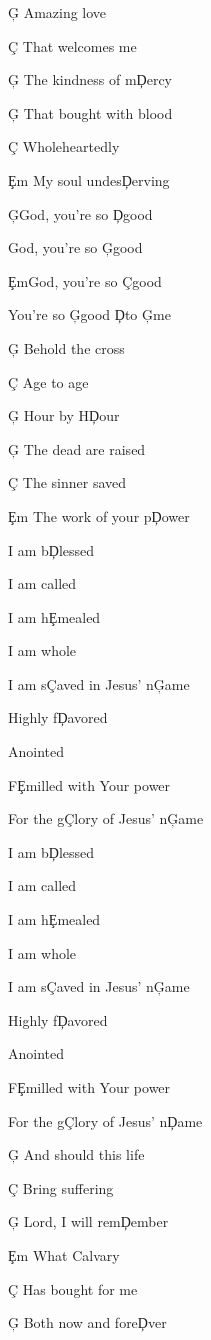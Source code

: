 \documentclass[9pt]{extarticle}
\begin{document}
\bsong

\bv
\c{G} Amazing love

\c{C} That welcomes me

\c{G} The kindness of m\c{D}ercy

\c{G} That bought with blood

\c{C} Wholeheartedly

\c{Em} My soul undes\c{D}erving
\ev

\bc
\c{G}God, you're so \c{D}good

God, you're so \c{G}good

\c{Em}God, you're so \c{C}good

You're so \c{G}good \c{D}to \c{G}me
\ec

\bv
\c{G} Behold the cross

\c{C} Age to age

\c{G} Hour by H\c{D}our

\c{G} The dead are raised

\c{C} The sinner saved

\c{Em} The work of your p\c{D}ower
\ev


\bb
I am b\c{D}lessed

I am called

I am h\c{Em}ealed

I am whole

I am s\c{C}aved in Jesus' n\c{G}ame

Highly f\c{D}avored

Anointed

F\c{Em}illed with Your power

For the g\c{C}lory of Jesus' n\c{G}ame
\eb

\bb
I am b\c{D}lessed

I am called

I am h\c{Em}ealed

I am whole

I am s\c{C}aved in Jesus' n\c{G}ame

Highly f\c{D}avored

Anointed

F\c{Em}illed with Your power

For the g\c{C}lory of Jesus' n\c{D}ame
\eb

\bv
\c{G} And should this life

\c{C} Bring suffering

\c{G} Lord, I will rem\c{D}ember

\c{Em} What Calvary

\c{C} Has bought for me

\c{G} Both now and fore\c{D}ver
\ev


\esong
\end{document}

